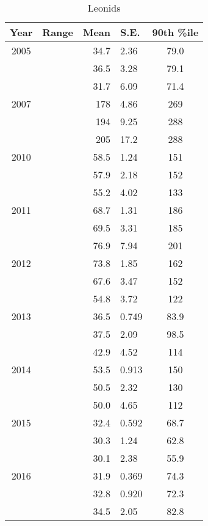 \begin{table}
	\centering
	\begin{tabular}{|c|c|r@{ \,$\pm$\, }l|c|}
		\hline 
		Year & Range & Mean & S.E. & 90th \%ile\\ 
		\hline 
		2005 & & 34.7 & 2.36 & 79.0   \\ 
		\hline 
		& & 36.5 & 3.28 & 79.1   \\ 
		\hline 
		& & 31.7 & 6.09 & 71.4   \\ 
		\hline 
		2007 & & 178 & 4.86 & 269   \\ 
		\hline 
		& &	 194 & 9.25 & 288   \\ 
		\hline 
		& & 205 & 17.2 & 288   \\ 
		\hline 
		2010 & & 58.5 & 1.24 & 151   \\ 
		\hline 
		& &	 57.9 & 2.18 & 152   \\ 
		\hline 
		& & 55.2 & 4.02 & 133   \\ 
		\hline 
		2011 & & 68.7 & 1.31 & 186   \\ 
		\hline 
		& & 69.5 & 3.31 & 185   \\ 
		\hline 
		& & 76.9 & 7.94 & 201   \\ 
		\hline 
		2012 & & 73.8 & 1.85 & 162   \\ 
		\hline 
		& & 67.6 & 3.47 & 152   \\ 
		\hline 
		& & 54.8 & 3.72 & 122   \\ 
		\hline 
		2013 & & 36.5 & 0.749 & 83.9   \\ 
		\hline 
		& & 37.5 & 2.09 & 98.5   \\ 
		\hline 
		& & 42.9 & 4.52 & 114   \\ 
		\hline 
		2014 & & 53.5 & 0.913 & 150   \\ 
		\hline 
		& & 50.5 & 2.32 & 130   \\ 
		\hline 
		& & 50.0 & 4.65 & 112  \\ 
		\hline 
		2015 & & 32.4 & 0.592 & 68.7   \\ 
		\hline 
		& & 30.3 & 1.24 & 62.8   \\ 
		\hline 
		& & 30.1 & 2.38 & 55.9   \\ 
		\hline
		2016 & & 31.9 & 0.369 & 74.3	\\
		\hline 
		& & 32.8 & 0.920 & 72.3   \\ 
		\hline 
		& & 34.5 & 2.05 & 82.8   \\ 
		\hline 
	\end{tabular}
\caption{Leonids} 
\end{table}

